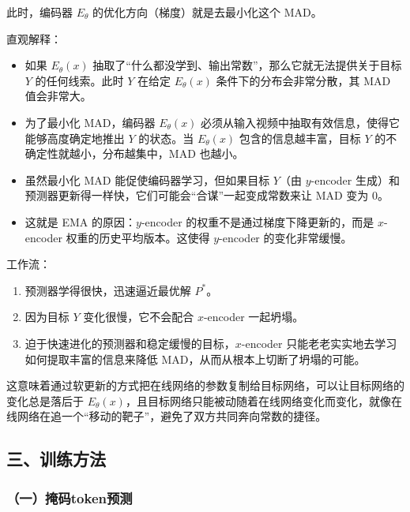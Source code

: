 此时，编码器 \(E_\theta\) 的优化方向（梯度）就是去最小化这个 MAD。

直观解释：

\begin{itemize}
\tightlist
\item
  如果 \(E_\theta(x)\) 抽取了``什么都没学到、输出常数''，那么它就无法提供关于目标 \(Y\) 的任何线索。此时 \(Y\) 在给定 \(E_\theta(x)\) 条件下的分布会非常分散，其 MAD 值会非常大。
\item
  为了最小化 MAD，编码器 \(E_\theta(x)\) 必须从输入视频中抽取有效信息，使得它能够高度确定地推出 \(Y\) 的状态。当 \(E_\theta(x)\) 包含的信息越丰富，目标 \(Y\) 的不确定性就越小，分布越集中，MAD 也越小。
\item
  虽然最小化 MAD 能促使编码器学习，但如果目标 \(Y\)（由 \(y\)-encoder 生成）和预测器更新得一样快，它们可能会``合谋''一起变成常数来让 MAD 变为 \(0\)。
\item
  这就是 EMA 的原因：\(y\)-encoder 的权重不是通过梯度下降更新的，而是 \(x\)-encoder 权重的历史平均版本。这使得 \(y\)-encoder 的变化非常缓慢。
\end{itemize}

工作流：

\begin{enumerate}
\def\labelenumi{\arabic{enumi}.}
\tightlist
\item
  预测器学得很快，迅速逼近最优解 \(P^{*}\)。
\item
  因为目标 \(Y\) 变化很慢，它不会配合 \(x\)-encoder 一起坍塌。
\item
  迫于快速进化的预测器和稳定缓慢的目标，\(x\)-encoder 只能老老实实地去学习如何提取丰富的信息来降低 MAD，从而从根本上切断了坍塌的可能。
\end{enumerate}

这意味着通过软更新的方式把在线网络的参数复制给目标网络，可以让目标网络的变化总是落后于 \(E_\theta(x)\)，且目标网络只能被动随着在线网络变化而变化，就像在线网络在追一个``移动的靶子''，避免了双方共同奔向常数的捷径。

\hypertarget{ux4e09ux8badux7ec3ux65b9ux6cd5-1}{%
\subsection{三、训练方法}\label{ux4e09ux8badux7ec3ux65b9ux6cd5-1}}

\hypertarget{ux4e00ux63a9ux7801tokenux9884ux6d4b}{%
\subsubsection{（一）掩码token预测}\label{ux4e00ux63a9ux7801tokenux9884ux6d4b}}

